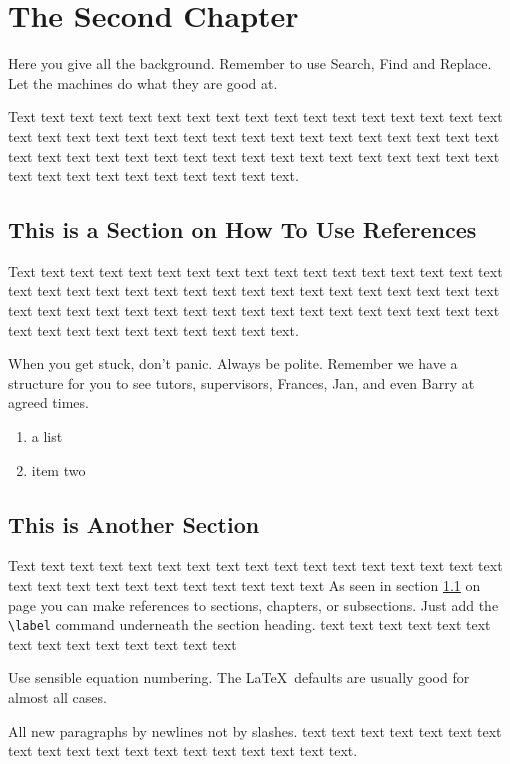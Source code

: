 \chapter{The Second Chapter}

Here you give all the background. Remember to use Search, Find and Replace. Let the machines do what they are good at. 

Text text text text text text text text text text text text text text
text text text text text text text text text text text text text text
text text text text text text text text text text text text text text
text text text text text text text text text text text text text text
text text text text text.

\section{This is a Section on How To Use References}
\label{howtoref}
Text text text text text text text text text text text text text text
text text text text text text text text text text text text text text
text text text text text text text text text text text text text text
text text text text text text text text text text text text text text
text text text text text. 

When you get stuck, don't panic. Always be polite. Remember we have a structure for
you to see tutors, supervisors, Frances, Jan, and even Barry at agreed times. 

\begin{enumerate}
	\item a list
	\item item two
\end{enumerate}

\section{This is Another Section}
Text text text text text text text text text text text text text text
text text text text text text text text text text text text text text
As seen in section \ref{howtoref} on page \pageref{howtoref} you can make references to sections, chapters, or subsections. Just add the \verb+\label+ command underneath the section heading. text text text text text text text text text text text text text text

Use sensible equation numbering. The \LaTeX\ defaults are usually good for almost all cases.

All new paragraphs by newlines not by slashes. text text text text text text text text text text text text text text
text text text text text. 

